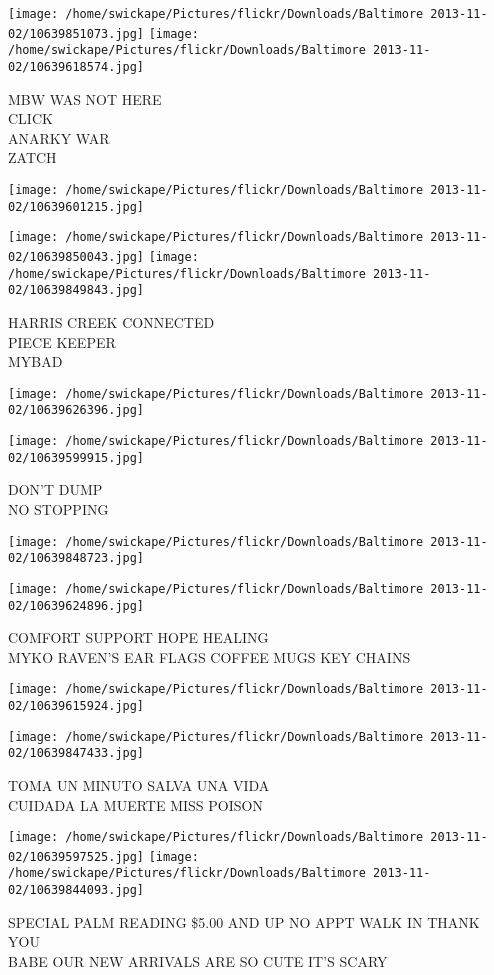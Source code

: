 \documentclass[10pt,letterpaper]{article}
\begin{document}
\texttt{[image: /home/swickape/Pictures/flickr/Downloads/Baltimore 2013-11-02/10639851073.jpg]}
\texttt{[image: /home/swickape/Pictures/flickr/Downloads/Baltimore 2013-11-02/10639618574.jpg]}

MBW WAS NOT HERE\\
CLICK\\
ANARKY WAR\\
ZATCH\\
\pagebreak

\texttt{[image: /home/swickape/Pictures/flickr/Downloads/Baltimore 2013-11-02/10639601215.jpg]}

\vspace{0.25in}
\texttt{[image: /home/swickape/Pictures/flickr/Downloads/Baltimore 2013-11-02/10639850043.jpg]}
\texttt{[image: /home/swickape/Pictures/flickr/Downloads/Baltimore 2013-11-02/10639849843.jpg]}

HARRIS CREEK CONNECTED\\
PIECE KEEPER\\
MYBAD\\
\pagebreak

\texttt{[image: /home/swickape/Pictures/flickr/Downloads/Baltimore 2013-11-02/10639626396.jpg]}

\vspace{0.25in}
\texttt{[image: /home/swickape/Pictures/flickr/Downloads/Baltimore 2013-11-02/10639599915.jpg]}

DON'T DUMP\\
NO STOPPING\\
\pagebreak

\texttt{[image: /home/swickape/Pictures/flickr/Downloads/Baltimore 2013-11-02/10639848723.jpg]}

\vspace{0.25in}
\texttt{[image: /home/swickape/Pictures/flickr/Downloads/Baltimore 2013-11-02/10639624896.jpg]}

COMFORT SUPPORT HOPE HEALING\\
MYKO RAVEN'S EAR FLAGS COFFEE MUGS KEY CHAINS\\
\pagebreak

\texttt{[image: /home/swickape/Pictures/flickr/Downloads/Baltimore 2013-11-02/10639615924.jpg]}

\vspace{0.25in}
\texttt{[image: /home/swickape/Pictures/flickr/Downloads/Baltimore 2013-11-02/10639847433.jpg]}

TOMA UN MINUTO SALVA UNA VIDA\\
CUIDADA LA MUERTE MISS POISON\\
\pagebreak

\texttt{[image: /home/swickape/Pictures/flickr/Downloads/Baltimore 2013-11-02/10639597525.jpg]}
\texttt{[image: /home/swickape/Pictures/flickr/Downloads/Baltimore 2013-11-02/10639844093.jpg]}

SPECIAL PALM READING \$5.00 AND UP NO APPT WALK IN THANK YOU\\
BABE OUR NEW ARRIVALS ARE SO CUTE IT'S SCARY\\
\pagebreak
\end{document}
